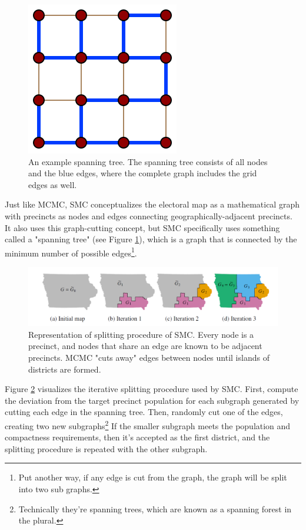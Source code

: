 \begin{figure}
    \centering
    \includegraphics[width=0.3\linewidth]{img/spantree.png}
    \caption{An example spanning tree. The spanning tree consists of all nodes and the blue edges, where the complete graph includes the grid edges as well. \parencite{eppstein2007}}
    \label{fig:spantree}
\end{figure}

Just like MCMC, SMC conceptualizes the electoral map as a mathematical graph with precincts as nodes and edges connecting geographically-adjacent precincts. It also uses this graph-cutting concept, but SMC specifically uses something called a "spanning tree" (see Figure \ref{fig:spantree}), which is a graph that is connected by the minimum number of possible edges\footnote{Put another way, if any edge is cut from the graph, the graph will be split into two sub graphs.}. 

\begin{figure}
    \centering
    \includegraphics[width=\linewidth]{img/smc.PNG}
    \caption{Representation of splitting procedure of SMC. Every node is a precinct, and nodes that share an edge are known to be adjacent precincts. MCMC "cuts away" edges between nodes until islands of districts are formed. \parencite[14]{mccartan2020}}
    \label{fig:smc}
\end{figure}

Figure \ref{fig:smc} visualizes the iterative splitting procedure used by SMC. First, compute the deviation from the target precinct population for each subgraph generated by cutting each edge in the spanning tree. Then, randomly cut one of the edges, creating two new subgraphs\footnote{Technically they're spanning trees, which are known as a spanning forest in the plural.} If the smaller subgraph meets the population and compactness requirements, then it's accepted as the first district, and the splitting procedure is repeated with the other subgraph. 

